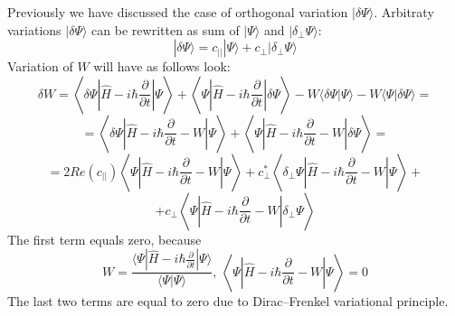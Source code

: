 Previously we have discussed the case of orthogonal variation $|\delta\Psi\rangle$. 
Arbitraty variations $|\delta\Psi\rangle$ can be rewritten as sum of $|\Psi\rangle$ and $|\delta_{\perp}\Psi\rangle$:
$$|\delta\Psi\rangle = c_{||}|\Psi\rangle + c_{\perp}|\delta_{\perp}\Psi\rangle$$
Variation of $W$ will have as follows look:
$$\delta W = \left\langle\delta\Psi\left|\hat{H}-i\hbar\frac{\partial}{\partial t}\right|\Psi\right\rangle + %
	     \left\langle\Psi\left|\hat{H}-i\hbar\frac{\partial}{\partial t}\right|\delta\Psi\right\rangle - 
	     W\langle\delta\Psi|\Psi\rangle - W\langle\Psi|\delta\Psi\rangle = $$
$$ = \left\langle\delta\Psi\left|\hat{H}-i\hbar\frac{\partial}{\partial t}-W\right|\Psi\right\rangle + %
     \left\langle\Psi\left|\hat{H}-i\hbar\frac{\partial}{\partial t}-W\right|\delta\Psi\right\rangle = $$
$$ = 2\mathit{Re}(c_{||})\left\langle\Psi\left|\hat{H}-i\hbar\frac{\partial}{\partial t}-W\right|\Psi\right\rangle + %
     c_{\perp}^*\left\langle\delta_{\perp}\Psi\left|\hat{H}-i\hbar\frac{\partial}{\partial t}-W\right|\Psi\right\rangle + $$
$$ + c_{\perp}\left\langle\Psi\left|\hat{H}-i\hbar\frac{\partial}{\partial t}-W\right|\delta_{\perp}\Psi\right\rangle $$
The first term equals zero, because
$$W = \frac{\langle\Psi|\hat{H}-i\hbar\frac{\partial}{\partial t}|\Psi\rangle}{\langle\Psi|\Psi\rangle},\ %
      \left\langle\Psi\left|\hat{H}-i\hbar\frac{\partial}{\partial t}-W\right|\Psi\right\rangle = 0$$
The last two terms are equal to zero due to Dirac--Frenkel variational principle.


